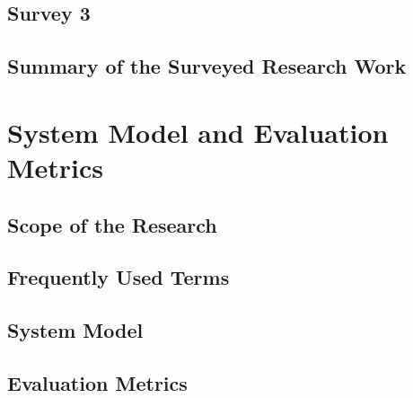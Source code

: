 \documentclass[10pt]{llncs}
\begin{document}


%
\subsection{Survey 3}






%
\subsection{Summary of the Surveyed Research Work}



%
\section{System Model and Evaluation Metrics}

%
\subsection{Scope of the Research}


%
\subsection{Frequently Used Terms}

%
\subsection{System Model}


%
\subsection{Evaluation Metrics}

\end{document}
